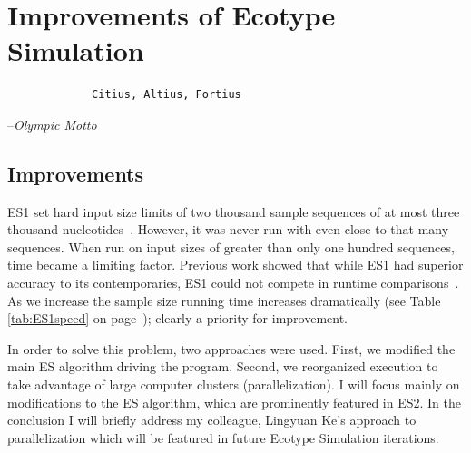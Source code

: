\gobbletocpage
\chapter{Improvements of Ecotype Simulation}
\restoretocpage

\begin{shadequote}
\begin{center}
    \Large\begin{verbatim} 
             Citius, Altius, Fortius
 \end{verbatim}  
\end{center}
\par--\emph{Olympic Motto}
\end{shadequote}


\section{Improvements}
ES1 set hard input size limits of two thousand sample sequences of at most three thousand nucleotides~\cite{koeppel2008identifying}.
However, it was never run with even close to that many sequences.
When run on input sizes of greater than only one hundred sequences, time became a limiting factor.
Previous work showed that while ES1 had superior  accuracy to its contemporaries, ES1 could not compete in runtime comparisons~\cite{carlo}.
As we increase the sample size running time increases dramatically (see Table \ref{tab:ES1speed} on page~\pageref{tab:ES1speed}); clearly a priority for improvement.

In order to solve this problem, two approaches were used.
First, we modified the main ES algorithm driving the program.
Second, we reorganized execution to take advantage of large computer clusters (parallelization).
I will focus mainly on modifications to the ES algorithm, which are prominently featured in ES2.
In the conclusion I will briefly address my colleague, Lingyuan Ke's approach to parallelization which will be featured in future Ecotype Simulation iterations.


